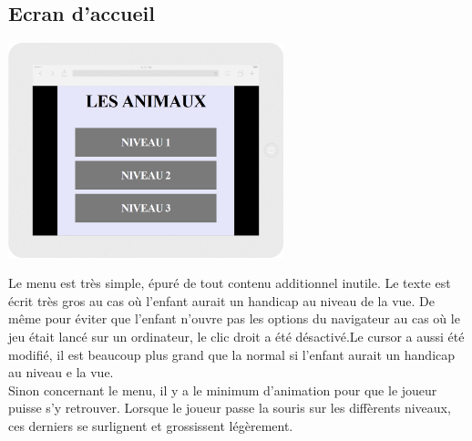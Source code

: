 \documentclass{article}
\begin{document}
\subsection{Ecran d'accueil}
\vspace{0.5cm}
\begin{center}
\includegraphics[width=0.6\textwidth]{page1}
\end{center}
\vspace{0.5cm}
\hspace*{0.6cm}Le menu est tr\`es simple, \'epur\'e de tout contenu additionnel inutile. Le texte est \'ecrit tr\`es gros au cas o\`u l'enfant aurait un handicap au niveau de la vue. De m\^eme pour \'eviter que l'enfant n'ouvre pas les options du navigateur au cas o\`u le jeu \'etait lanc\'e sur un ordinateur, le clic droit a \'et\'e d\'esactiv\'e.Le cursor a aussi \'et\'e modifi\'e, il est beaucoup plus grand que la normal si l'enfant aurait un handicap au niveau e la vue.
\vspace{0.5cm}\\
\hspace*{0.6cm}Sinon concernant le menu, il y a le minimum d'animation pour que le joueur puisse s'y retrouver. Lorsque le joueur passe la souris sur les diff\`erents niveaux, ces derniers se surlignent et grossissent l\'eg\`erement.
\end{document}
